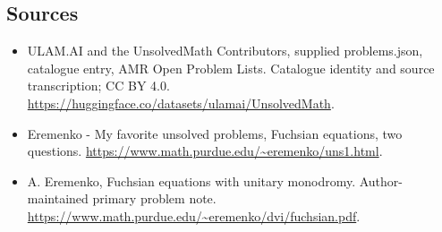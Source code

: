 \documentclass[11pt,a4paper]{article}
\begin{document}
\subsection{Sources}
\begin{itemize}
\item[S1] ULAM.AI and the UnsolvedMath Contributors, supplied problems.json, catalogue entry, AMR Open Problem Lists. Catalogue identity and source transcription; CC BY 4.0.
\url{https://huggingface.co/datasets/ulamai/UnsolvedMath}.
\item[S2] Eremenko - My favorite unsolved problems, Fuchsian equations, two questions. 
\url{https://www.math.purdue.edu/~eremenko/uns1.html}.
\item[S3] A. Eremenko, Fuchsian equations with unitary monodromy. Author-maintained primary problem note.
\url{https://www.math.purdue.edu/~eremenko/dvi/fuchsian.pdf}.
\end{itemize}
\end{document}
